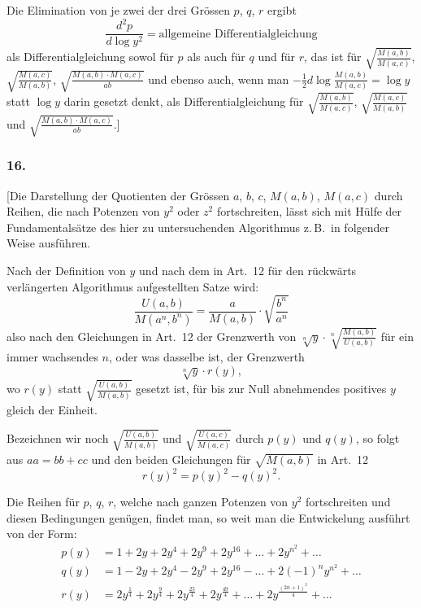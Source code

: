 \documentclass[12pt,a4paper]{article}
\begin{document}
Die Elimination von je zwei der drei Gr\"ossen $p$, $q$, $r$ ergibt
\[
\frac{d^2p}{d\log y^2} = \text{allgemeine Differentialgleichung}
\]
als Differentialgleichung sowol f\"ur $p$ als auch f\"ur $q$ und f\"ur $r$, das ist f\"ur $\sqrt{\frac{M(a,b)}{M(a,c)}}$, $\sqrt{\frac{M(a,c)}{M(a,b)}}$, $\sqrt{\frac{M(a,b)\cdot M(a,c)}{ab}}$ und ebenso auch, wenn man $-\tfrac{1}{2}d\log\frac{M(a,b)}{M(a,c)} = \log y$ statt $\log y$ darin gesetzt denkt, als Differentialgleichung f\"ur $\sqrt{\frac{M(a,b)}{M(a,c)}}$, $\sqrt{\frac{M(a,c)}{M(a,b)}}$ und $\sqrt{\frac{M(a,b)\cdot M(a,c)}{ab}}$.]

\subsubsection*{16.}

[Die Darstellung der Quotienten der Gr\"ossen $a$, $b$, $c$, $M(a,b)$, $M(a,c)$ durch Reihen, die nach Potenzen von $y^2$ oder $z^2$ fortschreiten, l\"asst sich mit H\"ulfe der Fundamentals\"atze des hier zu untersuchenden Algorithmus z.\,B.\ in folgender Weise ausf\"uhren.

Nach der Definition von $y$ und nach dem in Art.\ 12 f\"ur den r\"uckw\"arts verl\"angerten Algorithmus aufgestellten Satze wird:
\[
\frac{U(a,b)}{M(a^n,b^n)} = \frac{a}{M(a,b)}\cdot\sqrt{\frac{b^n}{a^n}}
\]
also nach den Gleichungen in Art.\ 12 der Grenzwerth von $\sqrt[n]{y}\cdot\sqrt[n]{\frac{M(a,b)}{U(a,b)}}$ f\"ur ein immer wachsendes $n$, oder was dasselbe ist, der Grenzwerth
\[
\sqrt[n]{y}\cdot r(y),
\]
wo $r(y)$ statt $\sqrt{\frac{U(a,b)}{M(a,b)}}$ gesetzt ist, f\"ur bis zur Null abnehmendes positives $y$ gleich der Einheit.

Bezeichnen wir noch $\sqrt{\frac{U(a,b)}{M(a,b)}}$ und $\sqrt{\frac{U(a,c)}{M(a,c)}}$ durch $p(y)$ und $q(y)$, so folgt aus $aa = bb + cc$ und den beiden Gleichungen f\"ur $\sqrt{M(a,b)}$ in Art.\ 12
\[
r(y)^2 = p(y)^2 - q(y)^2.
\]

Die Reihen f\"ur $p$, $q$, $r$, welche nach ganzen Potenzen von $y^2$ fortschreiten und diesen Bedingungen gen\"ugen, findet man, so weit man die Entwickelung ausf\"uhrt von der Form:
\[
\begin{aligned}
p(y) &= 1 + 2y + 2y^4 + 2y^9 + 2y^{16} + \dots + 2y^{n^2} + \dots \\
q(y) &= 1 - 2y + 2y^4 - 2y^9 + 2y^{16} - \dots + 2(-1)^n y^{n^2} + \dots \\
r(y) &= 2y^{\frac{1}{4}} + 2y^{\frac{9}{4}} + 2y^{\frac{25}{4}} + 2y^{\frac{49}{4}} + \dots + 2y^{\frac{(2n+1)^2}{4}} + \dots
\end{aligned}
\]
\end{document}
